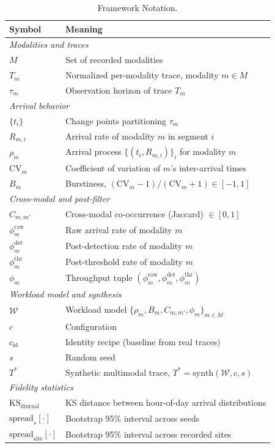 \begin{table}[b]
\centering
\footnotesize
\begin{tabular}{@{}ll@{}}
\toprule
\textbf{Symbol} & \textbf{Meaning} \\
\midrule
\multicolumn{2}{l}{\textit{Modalities and traces}} \\
$M$ & Set of recorded modalities \\
$T_m$ & Normalized per-modality trace, modality $m \in M$ \\
$\tau_m$ & Observation horizon of trace $T_m$ \\
\midrule
\multicolumn{2}{l}{\textit{Arrival behavior}} \\
$\{t_i\}$ & Change points partitioning $\tau_m$ \\
$R_{m,i}$ & Arrival rate of modality $m$ in segment $i$ \\
$\rho_m$ & Arrival process $\{(t_i, R_{m,i})\}_i$ for modality $m$ \\
$\mathrm{CV}_m$ & Coefficient of variation of $m$'s inter-arrival times \\
$B_m$ & Burstiness, $(\mathrm{CV}_m{-}1)/(\mathrm{CV}_m{+}1) \in [-1, 1]$ \\
\midrule
\multicolumn{2}{l}{\textit{Cross-modal and post-filter}} \\
$C_{m,m'}$ & Cross-modal co-occurrence (Jaccard) $\in [0, 1]$ \\
$\phi_m^{\mathrm{raw}}$ & Raw arrival rate of modality $m$ \\
$\phi_m^{\mathrm{det}}$ & Post-detection rate of modality $m$ \\
$\phi_m^{\mathrm{thr}}$ & Post-threshold rate of modality $m$ \\
$\phi_m$ & Throughput tuple $(\phi_m^{\mathrm{raw}}, \phi_m^{\mathrm{det}}, \phi_m^{\mathrm{thr}})$ \\
\midrule
\multicolumn{2}{l}{\textit{Workload model and synthesis}} \\
$\mathcal{W}$ & Workload model $\{\rho_m, B_m, C_{m,m'}, \phi_m\}_{m \in M}$ \\
$c$ & Configuration  \\
$c_{\mathrm{id}}$ & Identity recipe (baseline from real traces) \\
$s$ & Random seed \\
$T^*$ & Synthetic multimodal trace, $T^* = \mathrm{synth}(\mathcal{W}, c, s)$ \\
\midrule
\multicolumn{2}{l}{\textit{Fidelity statistics}} \\
$\mathrm{KS}_{\mathrm{diurnal}}$ & KS distance between hour-of-day arrival distributions \\
$\mathrm{spread}_s[\cdot]$ & Bootstrap 95\% interval across seeds \\
$\mathrm{spread}_{\mathrm{site}}[\cdot]$ & Bootstrap 95\% interval across recorded sites \\
\bottomrule
\end{tabular}
\caption{Framework Notation.}
\label{tab:notation}
\end{table}